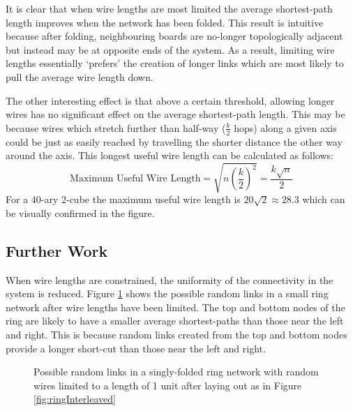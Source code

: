 			It is clear that when wire lengths are most limited the average
			shortest-path length improves when the network has been folded. This
			result is intuitive because after folding, neighbouring boards are
			no-longer topologically adjacent but instead may be at opposite ends of
			the system. As a result, limiting wire lengths essentially `prefers' the
			creation of longer links which are most likely to pull the average wire
			length down.
			
			The other interesting effect is that above a certain threshold, allowing
			longer wires has no significant effect on the average shortest-path
			length. This may be because wires which stretch further than half-way
			($\frac{k}{2}$ hops) along a given axis could be just as easily reached by
			travelling the shorter distance the other way around the axis. This
			longest useful wire length can be calculated as follows:
			\[
				\textrm{Maximum Useful Wire Length}
					= \sqrt{n \left({\frac{k}{2}}\right)^2}
					= \frac{k\sqrt{n}}{2}
			\]
			For a 40-ary 2-cube the maximum useful wire length is $20\sqrt{2} \approx
			28.3$ which can be visually confirmed in the figure.
		
		\subsection{Further Work}
			
			
			When wire lengths are constrained, the uniformity of the connectivity in
			the system is reduced. Figure \ref{fig:ringNetworkLimitedWires} shows the
			possible random links in a small ring network after wire lengths have been
			limited. The top and bottom nodes of the ring are likely to have a smaller
			average shortest-paths than those near the left and right. This is because
			random links created from the top and bottom nodes provide a longer
			short-cut than those near the left and right.
			
			\begin{figure}
				\center
				
				\caption[Possible random links in a singly-folded ring network with
				short wires]{Possible random links in a singly-folded ring network with
				random wires limited to a length of 1 unit after laying out as in Figure
				\ref{fig:ringInterleaved}}
				\label{fig:ringNetworkLimitedWires}
			\end{figure}
			
